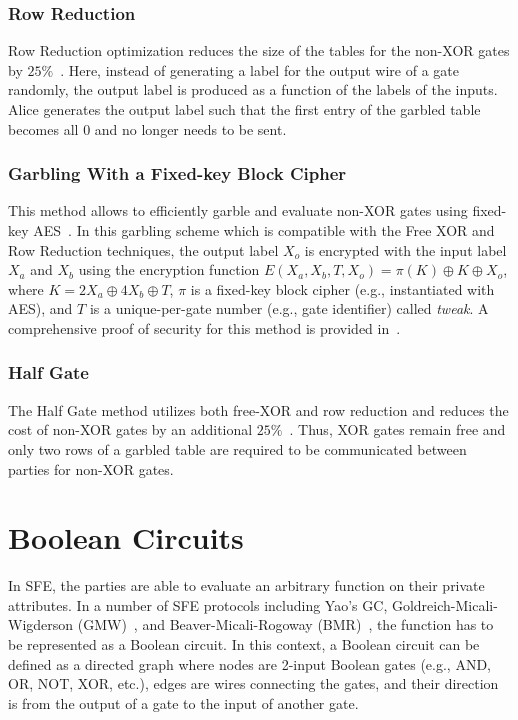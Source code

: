 \subsubsection{Row Reduction}\label{sssec:prelim-row}
Row Reduction optimization reduces the size of the tables for the non-XOR gates by $25\%$~\cite{naor1999privacy}.
Here, instead of generating a label for the output wire of a gate randomly, the output label is produced as a function of the labels of the inputs.
Alice generates the output label such that the first entry of the garbled table becomes all $0$ and no longer needs to be sent.

\subsubsection{Garbling With a Fixed-key Block Cipher}\label{sssec:prelim-aes}
This method allows to efficiently garble and evaluate non-XOR gates using fixed-key AES~\cite{bellare2013efficient}.
In this garbling scheme which is compatible with the Free XOR and Row Reduction techniques, the output label $X_{o}$ is encrypted with the input label $X_{a}$ and $X_{b}$ using the encryption function $E(X_a,X_b,T,X_o) = \pi(K) \oplus K \oplus X_o$, where $K=2X_a\oplus4X_b\oplus T$, $\pi$ is a fixed-key block cipher (e.g., instantiated with AES), and $T$ is a unique-per-gate number (e.g., gate identifier) called \emph{tweak}.
A comprehensive proof of security for this method is provided in~\cite{bellare2013efficient}.

\subsubsection{Half Gate}\label{sssec:prelim-half}
The Half Gate method utilizes both free-XOR and row reduction and reduces the cost of non-XOR gates by an additional $25\%$~\cite{zahur2015two}.
Thus, XOR gates remain free and only two rows of a garbled table are required to be communicated between parties for non-XOR gates.

\section{Boolean Circuits}\label{sec:prelim-circuit}
In SFE, the parties are able to evaluate an arbitrary function on their private attributes.
In a number of SFE protocols including Yao's GC, Goldreich-Micali-Wigderson (GMW)~\cite{goldreich1987play}, and Beaver-Micali-Rogoway (BMR)~\cite{beaver1990round}, the function has to be represented as a Boolean circuit.
In this context, a Boolean circuit can be defined as a directed graph where nodes are 2-input Boolean gates (e.g., AND, OR, NOT, XOR, etc.), edges are wires connecting the gates, and their direction is from the output of a gate to the input of another gate.

